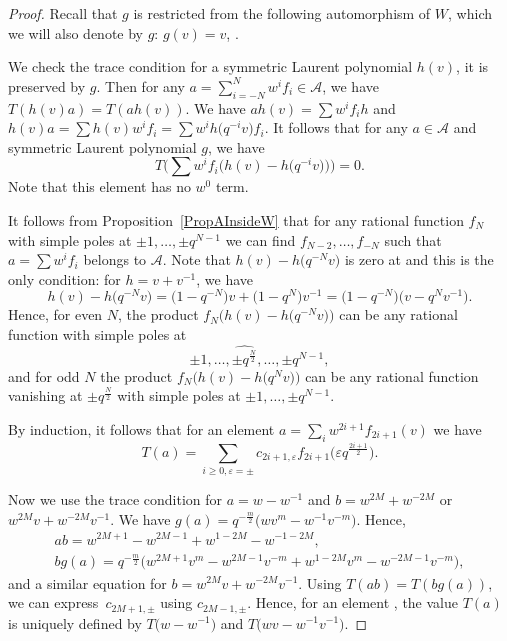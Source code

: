 \documentclass[pdftex]{sigma}
\newcommand\eps{\varepsilon}
\newcommand{\mc}{\mathcal}
\numberwithin{equation}{section}
\theoremstyle{definition}
\begin{document}
\begin{proof}
 Recall that $g$ is restricted from the following automorphism of $W$, which we will also denote by $g$: $g(v)=v$, .

 We check the trace condition for a symmetric Laurent polynomial $h(v)$, it is preserved by $g$. Then for any $a=\sum_{i=-N}^N w^i f_i\in\mc{A}$, we have
$T(h(v)a)=T(ah(v))$. We have $ah(v)=\sum w^i f_ih$ and $h(v)a=\sum h(v)w^i f_i=\sum w^i h\bigl(q^{-i}v\bigr)f_i$. It follows that for any $a\in\mc{A}$ and symmetric Laurent polynomial $g$, we have
 \[T\Big(\sum w^i f_i\bigl(h(v)-h\bigl(q^{-i}v\bigr)\bigr)\Big)=0.\] Note that this element has no $w^0$ term.

 It follows from Proposition~\ref{PropAInsideW} that for any rational function $f_N$ with simple poles at $\pm 1,\ldots,\pm q^{N-1}$ we can find $f_{N-2},\ldots, f_{-N}$ such that $a=\sum w^i f_i$ belongs to $\mc{A}$. Note that $h(v)-h\bigl(q^{-N}v\bigr)$ is zero at  and this is the only condition: for $h=v+v^{-1}$, we have
 \[
 h(v)-h\bigl(q^{-N}v\bigr)=\bigl(1-q^{-N}\bigr)v+\bigl(1-q^N\bigr)v^{-1}=\bigl(1-q^{-N}\bigr)\bigl(v-q^Nv^{-1}\bigr).
\]
 Hence, for even $N$, the product $f_N\bigl(h(v)-h\bigl(q^{-N}v\bigr)\bigr)$ can be any rational function with simple poles at \[
 \pm 1,\ldots,\widehat{\pm q^{\frac{N}{2}}},\ldots,\pm q^{N-1},\]
 and for odd $N$ the product $f_N\bigl(h(v)-h\bigl(q^Nv\bigr)\bigr)$ can be any rational function vanishing at $\pm q^{\frac{N}{2}}$ with simple poles at $\pm 1,\ldots,\pm q^{N-1}$.

 By induction, it follows that for an element $a=\sum_i w^{2i+1}f_{2i+1}(v)$ we have \[T(a)=\sum_{i\geq 0,\eps=\pm}c_{2i+1,\eps}f_{2i+1}\bigl(\eps q^{\frac{2i+1}{2}}\bigr).\]

 Now we use the trace condition for $a=w-w^{-1}$ and $b=w^{2M}+w^{-2M}$ or $w^{2M}v+w^{-2M}v^{-1}$. We have $g(a)=q^{-\frac{m}{2}}\bigl(wv^m-w^{-1}v^{-m}\bigr)$. Hence,
 \begin{gather*}
 ab=w^{2M+1}-w^{2M-1}+w^{1-2M}-w^{-1-2M},\\
 bg(a)=q^{-\frac{m}{2}}\bigl(w^{2M+1}v^m-w^{2M-1}v^{-m}+w^{1-2M}v^m-w^{-2M-1}v^{-m}\bigr),
 \end{gather*}
 and a similar equation for $b=w^{2M}v+w^{-2M}v^{-1}$. Using $T(ab)=T(bg(a))$, we can express~$c_{2M+1,\pm}$ using $c_{2M-1,\pm}$. Hence, for an element , the value $T(a)$ is uniquely defined by $T\bigl(w-w^{-1}\bigr)$ and $T\bigl(wv-w^{-1}v^{-1}\bigr)$.


\end{proof}
\end{document}
